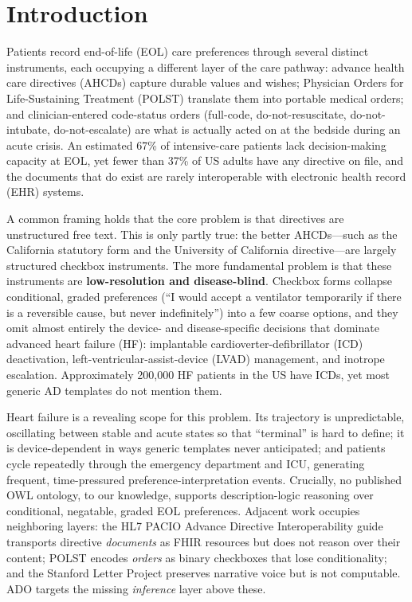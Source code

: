 \documentclass[10pt]{article}
\begin{document}
\section{Introduction}
Patients record end-of-life (EOL) care preferences through several distinct instruments, each occupying a different layer of the care pathway: advance health care directives (AHCDs) capture durable values and wishes; Physician Orders for Life-Sustaining Treatment (POLST) translate them into portable medical orders; and clinician-entered code-status orders (full-code, do-not-resuscitate, do-not-intubate, do-not-escalate) are what is actually acted on at the bedside during an acute crisis. An estimated 67\% of intensive-care patients lack decision-making capacity at EOL,\cite{silveira2010} yet fewer than 37\% of US adults have any directive on file,\cite{yadav2017} and the documents that do exist are rarely interoperable with electronic health record (EHR) systems.\cite{hl7adi2024}

A common framing holds that the core problem is that directives are unstructured free text. This is only partly true: the better AHCDs---such as the California statutory form and the University of California directive---are largely structured checkbox instruments. The more fundamental problem is that these instruments are \textbf{low-resolution and disease-blind}. Checkbox forms collapse conditional, graded preferences (``I would accept a ventilator temporarily if there is a reversible cause, but never indefinitely'') into a few coarse options, and they omit almost entirely the device- and disease-specific decisions that dominate advanced heart failure (HF): implantable cardioverter-defibrillator (ICD) deactivation, left-ventricular-assist-device (LVAD) management, and inotrope escalation. Approximately 200,000 HF patients in the US have ICDs,\cite{kremers2023} yet most generic AD templates do not mention them.

Heart failure is a revealing scope for this problem. Its trajectory is unpredictable, oscillating between stable and acute states so that ``terminal'' is hard to define; it is device-dependent in ways generic templates never anticipated; and patients cycle repeatedly through the emergency department and ICU, generating frequent, time-pressured preference-interpretation events.\cite{allen2012} Crucially, no published OWL ontology, to our knowledge, supports description-logic reasoning over conditional, negatable, graded EOL preferences. Adjacent work occupies neighboring layers: the HL7 PACIO Advance Directive Interoperability guide\cite{hl7adi2024} transports directive \emph{documents} as FHIR resources but does not reason over their content; POLST encodes \emph{orders} as binary checkboxes that lose conditionality; and the Stanford Letter Project\cite{periyakoil} preserves narrative voice but is not computable. ADO targets the missing \emph{inference} layer above these.
\end{document}
